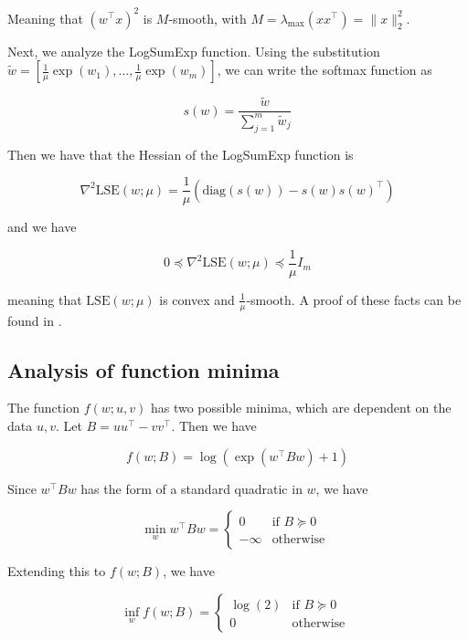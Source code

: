 \documentclass[11pt]{article}
\begin{document}
Meaning that $(w^{\top} x)^2$ is $M$-smooth, with $M = \lambda_{\max}(xx^{\top}) = \|x\|_2^2$.

Next, we analyze the LogSumExp function. Using the substitution $\tilde{w} = [\frac{1}{\mu}\exp(w_1), ..., \frac{1}{\mu}\exp(w_m)]$, we can write the softmax function as

\begin{equation}
    s(w) = \frac{\tilde{w}}{\sum_{j=1}^{m} \tilde{w}_j}
\end{equation}

Then we have that the Hessian of the LogSumExp function is

\begin{equation}
    \nabla^2 \textrm{LSE}(w; \mu) = \frac{1}{\mu} (\textrm{diag}(s(w)) - s(w)s(w)^{\top}) 
\end{equation}

and we have

\begin{equation}
    0 \preceq \nabla^2 \textrm{LSE}(w; \mu) \preceq \frac{1}{\mu} I_m
\end{equation}

meaning that $\textrm{LSE}(w; \mu)$ is convex and $\frac{1}{\mu}$-smooth. A proof of these facts can be found in \cite{gao_properties_2018}.

\subsection{Analysis of function minima}

The function $f(w; u, v)$ has two possible minima, which are dependent on the data $u, v$. Let $B = uu^{\top} - vv^{\top}$. Then we have

\begin{equation}
    f(w; B) = \log(\exp(w^{\top}Bw) + 1)
\end{equation}

Since $w^{\top}Bw$ has the form of a standard quadratic in $w$, we have

\begin{equation}
    \min_{w} w^{\top}Bw = \begin{cases} 
    0 &\mbox{if } B \succeq 0 \\
    -\infty & \mbox{otherwise } \end{cases}
\end{equation}

Extending this to $f(w; B)$, we have

\begin{equation}
    \inf_{w} f(w; B) = \begin{cases} 
    \log(2) &\mbox{if } B \succeq 0 \\
    0 & \mbox{otherwise } \end{cases}
\end{equation}
\end{document}
